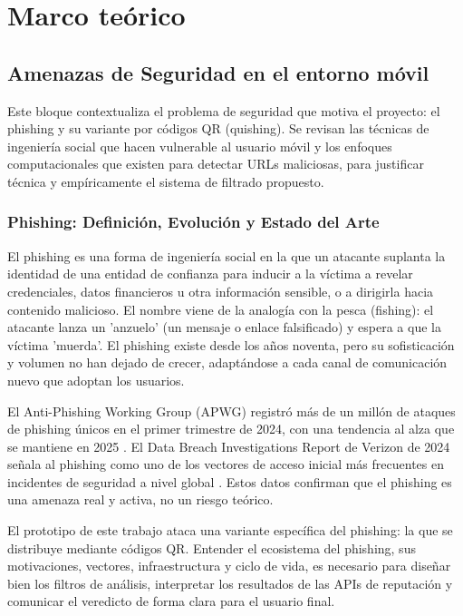 \chapter{Marco te\'orico}

\section{Amenazas de Seguridad en el entorno m\'ovil}

Este bloque contextualiza el problema de seguridad que motiva el proyecto: el phishing y su variante por c\'odigos QR (quishing). Se revisan las t\'ecnicas de ingenier\'ia social que hacen vulnerable al usuario m\'ovil y los enfoques computacionales que existen para detectar URLs maliciosas, para justificar t\'ecnica y emp\'iricamente el sistema de filtrado propuesto.

\subsection{Phishing: Definici\'on, Evoluci\'on y Estado del Arte}

El phishing es una forma de ingenier\'ia social en la que un atacante suplanta la identidad de una entidad de confianza para inducir a la v\'ictima a revelar credenciales, datos financieros u otra informaci\'on sensible, o a dirigirla hacia contenido malicioso. El nombre viene de la analog\'ia con la pesca (fishing): el atacante lanza un 'anzuelo' (un mensaje o enlace falsificado) y espera a que la v\'ictima 'muerda'. El phishing existe desde los a\~nos noventa, pero su sofisticaci\'on y volumen no han dejado de crecer, adapt\'andose a cada canal de comunicaci\'on nuevo que adoptan los usuarios.

El Anti-Phishing Working Group (APWG) registr\'o m\'as de un mill\'on de ataques de phishing \'unicos en el primer trimestre de 2024, con una tendencia al alza que se mantiene en 2025 \cite{apwg2024q1,apwg2025q1}. El Data Breach Investigations Report de Verizon de 2024 se\~nala al phishing como uno de los vectores de acceso inicial m\'as frecuentes en incidentes de seguridad a nivel global \cite{verizon2024dbir}. Estos datos confirman que el phishing es una amenaza real y activa, no un riesgo te\'orico.

El prototipo de este trabajo ataca una variante espec\'ifica del phishing: la que se distribuye mediante c\'odigos QR. Entender el ecosistema del phishing, sus motivaciones, vectores, infraestructura y ciclo de vida, es necesario para dise\~nar bien los filtros de an\'alisis, interpretar los resultados de las APIs de reputaci\'on y comunicar el veredicto de forma clara para el usuario final.

